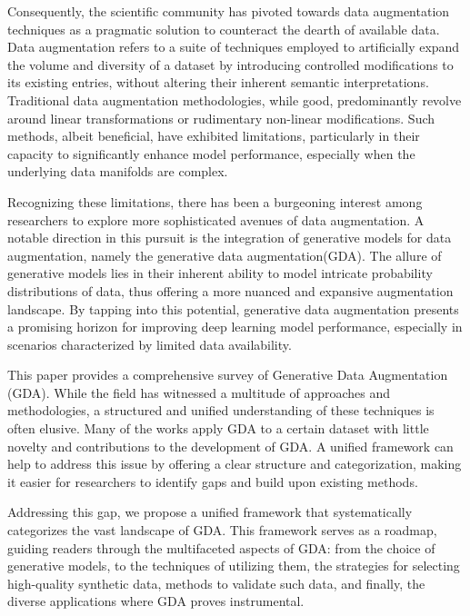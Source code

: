 \documentclass[preprint,12pt,authoryear]{elsarticle}
\begin{document}
Consequently, the scientific community has pivoted towards data augmentation techniques as a pragmatic solution to counteract the dearth of available data. Data augmentation refers to a suite of techniques employed to artificially expand the volume and diversity of a dataset by introducing controlled modifications to its existing entries, without altering their inherent semantic interpretations.\cite{14_data_augmentation,15_data_augmentation} Traditional data augmentation\cite{10_data_augmentation} methodologies, while good, predominantly revolve around linear transformations or rudimentary non-linear modifications. Such methods, albeit beneficial, have exhibited limitations, particularly in their capacity to significantly enhance model performance, especially when the underlying data manifolds are complex. 

Recognizing these limitations, there has been a burgeoning interest among researchers to explore more sophisticated avenues of data augmentation. A notable direction in this pursuit is the integration of generative models for data augmentation, namely the generative data augmentation(GDA). The allure of generative models lies in their inherent ability to model intricate probability distributions of data\cite{11_data_distribution,12_data_distribution,13_data_distribution}, thus offering a more nuanced and expansive augmentation landscape. By tapping into this potential, generative data augmentation presents a promising horizon for improving deep learning model performance, especially in scenarios characterized by limited data availability.

This paper provides a comprehensive survey of Generative Data Augmentation (GDA). While the field has witnessed a multitude of approaches and methodologies, a structured and unified understanding of these techniques is often elusive. Many of the works apply GDA to a certain dataset with little novelty and contributions to the development of GDA. A unified framework can help to address this issue by offering a clear structure and categorization, making it easier for researchers to identify gaps and build upon existing methods.

Addressing this gap, we propose a unified framework that systematically categorizes the vast landscape of GDA. This framework serves as a roadmap, guiding readers through the multifaceted aspects of GDA: from the choice of generative models, to the techniques of utilizing them, the strategies for selecting high-quality synthetic data, methods to validate such data, and finally, the diverse applications where GDA proves instrumental.
\end{document}
